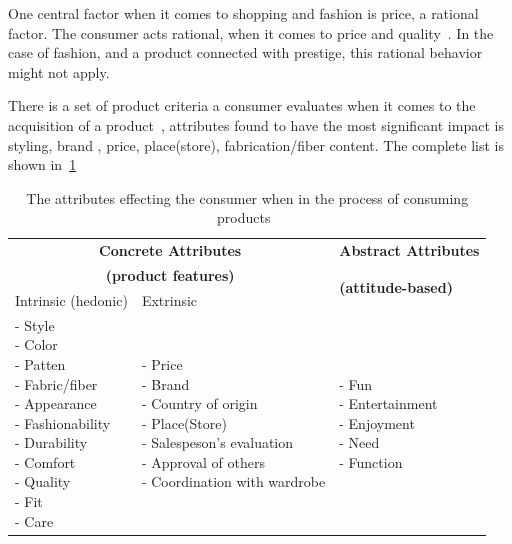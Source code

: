 One central factor when it comes to shopping and fashion is price, a rational factor.
The consumer acts rational, when it comes to price and quality~\cite{Hanf1994}.
In the case of fashion, and a product connected with prestige, this rational behavior might not apply.

There is a set of product criteria a consumer evaluates when it comes to the acquisition of a product~\cite{dutton2006}, attributes found to have the most significant impact is styling, brand , price, place(store), fabrication/fiber content.
The complete list is shown in~\ref{table:ConsumersPurchaseDec}

\begin{table}[H]
    \centering
    \begin{tabular}{l|l|l}
      \multicolumn{2}{c|}{\textbf{Concrete Attributes}} & \textbf{Abstract Attributes} \\
      \multicolumn{2}{c|}{\textbf{(product features)}} & \multirow{2}{*}{\textbf{(attitude-based)}} \\ \cline{1-2}
      Intrinsic (hedonic)   & Extrinsic & \\ \hline
      \pbox{4cm}{
          - Style \\
          - Color \\
          - Patten \\
          - Fabric/fiber \\
          - Appearance \\
          - Fashionability \\
          - Durability \\
          - Comfort \\
          - Quality \\
          - Fit \\
          - Care \\
      } & \pbox{6cm}{
          - Price \\
          - Brand \\
          - Country of origin \\
          - Place(Store) \\
          - Salespeson's evaluation \\
          - Approval of others \\
          - Coordination with wardrobe \\
      } & \pbox{4cm}{
          - Fun \\
          - Entertainment \\
          - Enjoyment \\
          - Need \\
          - Function \\
        } \\ \hline
    \end{tabular}
    \label{table:ConsumersPurchaseDec}
    \caption [Consumers' Purchase Decisions]{The attributes effecting the consumer when in the process of consuming products~\cite{dutton2006}}
\end{table}


